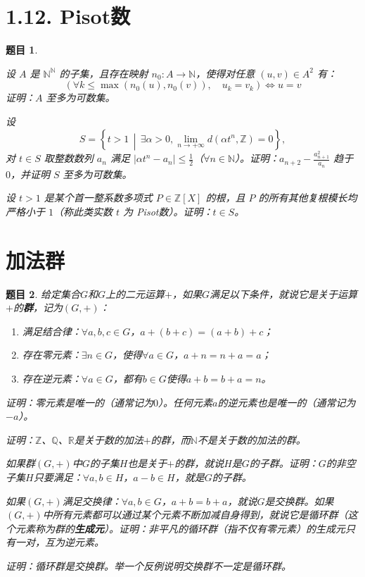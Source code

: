 \documentclass[12pt,UTF8]{ctexbook}
\theoremstyle{exercisestyle}
\newtheorem*{exercise}{题目}
\theoremstyle{solutionstyle}
\begin{document}
\section{1.12. Pisot数}
\begin{exercise}
  \begin{subquestions}
    \item 设 $A$ 是 $\mathbb{N}^{\mathbb{N}}$ 的子集，且存在映射 $n_0: A \to \mathbb{N}$，使得对任意 $(u, v) \in A^2$ 有：
    $$
    (\forall k \leq \max(n_0(u), n_0(v)), \quad u_k = v_k) \iff u = v
    $$
    证明：$A$ 至多为可数集。

    \item 设 
    $$S = \left\{ t > 1 \,\middle|\, \exists \alpha > 0, \lim_{n \to +\infty} d(\alpha t^n, \mathbb{Z}) = 0 \right\},$$
    对 $t \in S$ 取整数数列 $a_n$ 满足 $|\alpha t^n - a_n| \leq \frac{1}{2}$（$\forall n \in \mathbb{N}$）。证明：$a_{n+2} - \frac{a_{n+1}^2}{a_n}$ 趋于 $0$，并证明 $S$ 至多为可数集。

    \item 设 $t > 1$ 是某个首一整系数多项式 $P \in \mathbb{Z}[X]$ 的根，且 $P$ 的所有其他复根模长均严格小于 $1$（称此类实数 $t$ 为 \emph{Pisot数}）。证明：$t \in S$。
  \end{subquestions}
\end{exercise}

\section{加法群}
\begin{exercise}
    给定集合$G$和$G$上的二元运算$+$，如果$G$满足以下条件，就说它是关于运算$+$的\textbf{群}，记为$(G,+)$：
    \begin{enumerate}[label=\arabic*.]
        \item 满足结合律：$\forall a, b, c \in G$，$a + (b + c) = (a + b) + c$；
        \item 存在零元素：$\exists n \in G$，使得$\forall a \in G$，$a + n = n + a = a$；
        \item 存在逆元素：$\forall a \in G$，都有$b \in G$使得$a + b = b + a = n$。
    \end{enumerate}
    \begin{subquestions}
        \item 证明：零元素是唯一的（通常记为$0$）。任何元素$a$的逆元素也是唯一的（通常记为$-a$）。
        \item 证明：$\mathbb{Z}$、$\mathbb{Q}$、$\mathbb{R}$是关于数的加法$+$的群，而$\mathbb{N}$不是关于数的加法的群。
        \item 如果群$(G, +)$中$G$的子集$H$也是关于$+$的群，就说$H$是$G$的子群。证明：$G$的非空子集$H$只要满足：$\forall a, b \in H$，$a - b \in H$，就是$G$的子群。
        \item 如果$(G,+)$满足交换律：$\forall a, b \in G$，$a + b = b + a$，就说$G$是交换群。如果$(G,+)$中所有元素都可以通过某个元素不断加减自身得到，就说它是循环群（这个元素称为群的\textbf{生成元}）。证明：非平凡的循环群（指不仅有零元素）的生成元只有一对，互为逆元素。
        \item 证明：循环群是交换群。举一个反例说明交换群不一定是循环群。
    \end{subquestions}
\end{exercise}
\end{document}

